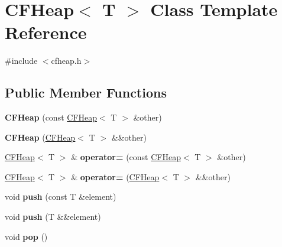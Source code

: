 \hypertarget{classCFHeap}{}\section{C\+F\+Heap$<$ T $>$ Class Template Reference}
\label{classCFHeap}


{\ttfamily \#include $<$cfheap.\+h$>$}

\subsection*{Public Member Functions}
\begin{DoxyCompactItemize}
\item 
\hypertarget{classCFHeap_ab18c10dd55e09f936d228536c3e35d23}{}{\bfseries C\+F\+Heap} (const \hyperlink{classCFHeap}{C\+F\+Heap}$<$ T $>$ \&other)\label{classCFHeap_ab18c10dd55e09f936d228536c3e35d23}

\item 
\hypertarget{classCFHeap_a3f81b6e08a985675774366675e289d08}{}{\bfseries C\+F\+Heap} (\hyperlink{classCFHeap}{C\+F\+Heap}$<$ T $>$ \&\&other)\label{classCFHeap_a3f81b6e08a985675774366675e289d08}

\item 
\hypertarget{classCFHeap_ab05d035f1849cc3f85ba77161f55df27}{}\hyperlink{classCFHeap}{C\+F\+Heap}$<$ T $>$ \& {\bfseries operator=} (const \hyperlink{classCFHeap}{C\+F\+Heap}$<$ T $>$ \&other)\label{classCFHeap_ab05d035f1849cc3f85ba77161f55df27}

\item 
\hypertarget{classCFHeap_a873056ae7e3e4b42f0a337676d2ee1cf}{}\hyperlink{classCFHeap}{C\+F\+Heap}$<$ T $>$ \& {\bfseries operator=} (\hyperlink{classCFHeap}{C\+F\+Heap}$<$ T $>$ \&\&other)\label{classCFHeap_a873056ae7e3e4b42f0a337676d2ee1cf}

\item 
\hypertarget{classCFHeap_a0f8c7be0e656512b87386997fa19c04d}{}void {\bfseries push} (const T \&element)\label{classCFHeap_a0f8c7be0e656512b87386997fa19c04d}

\item 
\hypertarget{classCFHeap_a7af5e963d8aa5ba4324ecb8509dd5e96}{}void {\bfseries push} (T \&\&element)\label{classCFHeap_a7af5e963d8aa5ba4324ecb8509dd5e96}

\item 
\hypertarget{classCFHeap_a46517a7478bda0c3261ce52b1d00c049}{}void {\bfseries pop} ()\label{classCFHeap_a46517a7478bda0c3261ce52b1d00c049}


\end{DoxyCompactItemize}
